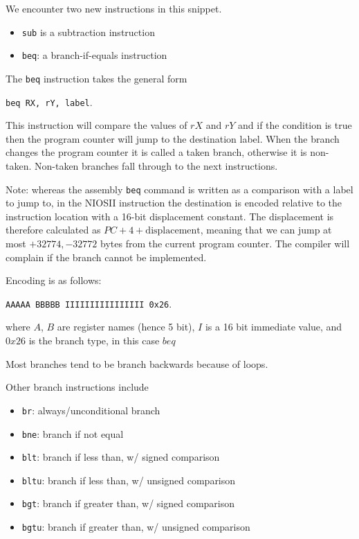 \documentclass[../notes.tex]{subfiles}
\begin{document}
\begin{definition}

	We encounter two new instructions in this snippet.
\begin{itemize}
	\item \texttt{sub} is a subtraction instruction
	\item \texttt{beq}: a branch-if-equals instruction
\end{itemize}

The \texttt{beq} instruction takes the general form 

\texttt{beq RX, rY, label}. 

This instruction will compare the values of $ rX $ and $ rY $ and if the condition is true then the program counter will jump to the destination label. 
When the branch changes the program counter it is called a taken branch, otherwise it is non-taken. Non-taken branches fall through to the next instructions. 

\begin{blockquote}
	Note: whereas the assembly \texttt{beq} command is written as a comparison with a label to jump to, in the NIOSII instruction the destination is encoded relative to the instruction location with a 16-bit displacement constant. The displacement is therefore calculated as $ PC + 4 + \text{displacement} $, meaning that we can jump at most $ +32774, -32772 $ bytes from the current program counter. The compiler will complain if the branch cannot be implemented.


	Encoding is as follows: 

	\texttt{AAAAA BBBBB IIIIIIIIIIIIIIII 0x26}.

	where $ A $, $ B $ are register names (hence 5 bit), $ I $ is a 16 bit immediate value, and $ 0x26 $ is the branch type, in this case $ beq $  


	Most branches tend to be branch backwards because of loops.
\end{blockquote}


Other branch instructions include


\begin{itemize}
	\item \texttt{br}: always/unconditional branch
	\item \texttt{bne}: branch if not equal
	\item \texttt{blt}: branch if less than, w/ signed comparison
	\item \texttt{bltu}: branch if less than, w/ unsigned comparison
	\item \texttt{bgt}: branch if greater than, w/ signed comparison
	\item \texttt{bgtu}: branch if greater than, w/ unsigned comparison


\end{itemize}


\end{definition}
\end{document}

